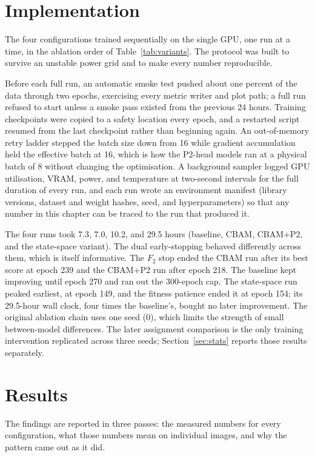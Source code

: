 \section{Implementation}
\label{sec:protocol}
The four configurations trained sequentially on the single GPU, one run at a
time, in the ablation order of Table~\ref{tab:variants}. The protocol was
built to survive an unstable power grid and to make every number reproducible.

Before each full run, an automatic smoke test pushed about one percent of the
data through two epochs, exercising every metric writer and plot path; a full
run refused to start unless a smoke pass existed from the previous 24 hours.
Training checkpoints were copied to a safety location every epoch, and a
restarted script resumed from the last checkpoint rather than beginning
again. An out-of-memory retry ladder stepped the batch size down from 16
while gradient accumulation held the effective batch at 16, which is how the
P2-head models ran at a physical batch of 8 without changing the
optimisation. A background sampler logged GPU utilisation, VRAM, power, and
temperature at two-second intervals for the full duration of every run, and
each run wrote an environment manifest (library versions, dataset and weight
hashes, seed, and hyperparameters) so that any number in this chapter can be
traced to the run that produced it.

The four runs took 7.3, 7.0, 10.2, and 29.5 hours (baseline, CBAM, CBAM+P2,
and the state-space variant). The dual early-stopping behaved differently
across them, which is itself informative. The $F_2$ stop ended the CBAM run
after its best score at epoch 239 and the CBAM+P2 run after epoch 218. The
baseline kept improving until epoch 270 and ran out the 300-epoch cap. The
state-space run peaked earliest, at epoch 149, and the fitness patience ended
it at epoch 154; its 29.5-hour wall clock, four times the baseline's, bought
no later improvement. The original ablation chain uses one seed (0), which
limits the strength of small between-model differences. The later assignment
comparison is the only training intervention replicated across three seeds;
Section~\ref{sec:stats} reports those results separately.

\section{Results}
\label{sec:results}
The findings are reported in three passes: the measured numbers for every
configuration, what those numbers mean on individual images, and why the
pattern came out as it did.


